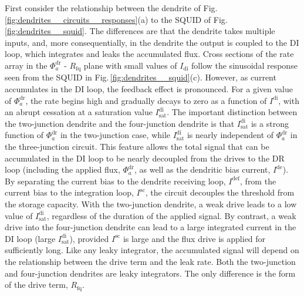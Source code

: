 \documentclass[twocolumn]{article}
\begin{document}
First consider the relationship between the dendrite of Fig.\,\ref{fig:dendrites__circuits__responses}(a) to the SQUID of Fig.\,\ref{fig:dendrites__squid}. The differences are that the dendrite takes multiple inputs, and, more consequentially, in the dendrite the output is coupled to the DI loop, which integrates and leaks the accumulated flux. Cross sections of the rate array in the $\Phi^{\mathrm{dr}}_a$ - $R_{\mathrm{fq}}$ plane with small values of $I_{\mathrm{di}}$ follow the sinusoidal response seen from the SQUID in Fig.\,\ref{fig:dendrites__squid}(c). However, as current accumulates in the DI loop, the feedback effect is pronounced. For a given value of $\Phi^{\mathrm{dr}}_a$, the rate begins high and gradually decays to zero as a function of $I^{\mathrm{di}}$, with an abrupt cessation at a saturation value $I^{\mathrm{di}}_{\mathrm{sat}}$. The important distinction between the two-junction dendrite and the four-junction dendrite is that $I^{\mathrm{di}}_{\mathrm{sat}}$ is a strong function of $\Phi^{\mathrm{dr}}_a$ in the two-junction case, while $I^{\mathrm{di}}_{\mathrm{sat}}$ is nearly independent of $\Phi^{\mathrm{dr}}_a$ in the three-junction circuit. This feature allows the total signal that can be accumulated in the DI loop to be nearly decoupled from the drives to the DR loop (including the applied flux, $\Phi^{\mathrm{dr}}_a$, as well as the dendritic bias current, $I^{\mathrm{de}}$). By separating the current bias to the dendrite receiving loop, $I^{\mathrm{def}}$, from the current bias to the integration loop, $I^{\mathrm{sc}}$, the circuit decouples the threshold from the storage capacity. With the two-junction dendrite, a weak drive leads to a low value of $I^{\mathrm{di}}_{\mathrm{sat}}$, regardless of the duration of the applied signal. By contrast, a weak drive into the four-junction dendrite can lead to a large integrated current in the DI loop (large $I^{\mathrm{di}}_{\mathrm{sat}}$), provided $I^{\mathrm{sc}}$ is large and the flux drive is applied for sufficiently long. Like any leaky integrator, the accumulated signal will depend on the relationship between the drive term and the leak rate. Both the two-junction and four-junction dendrites are leaky integrators. The only difference is the form of the drive term, $R_{\mathrm{fq}}$.  
\end{document}

